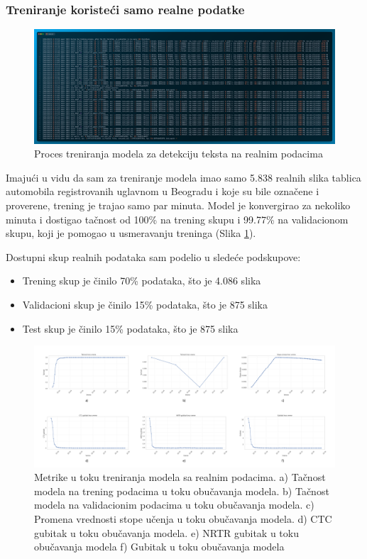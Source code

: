 \documentclass[a4paper,12pt]{article}
\begin{document}
	\subsubsection{Treniranje koristeći samo realne podatke}
	\begin{figure}[H]
		\centering
		\includegraphics[width=\textwidth]{assets/train-code-real-data.png}
		\caption{Proces treniranja modela za detekciju teksta na realnim podacima}
		\label{fig:train-code-real-data}
	\end{figure}
	
	Imajući u vidu da sam za treniranje modela imao samo 5.838 realnih slika tablica automobila registrovanih uglavnom u Beogradu i koje su bile označene i proverene, trening je trajao samo par minuta. Model je konvergirao za nekoliko minuta i dostigao tačnost od 100\% na trening skupu i 99.77\% na validacionom skupu, koji je pomogao u usmeravanju treninga (Slika \ref{fig:train-code-real-data}).\newline
	
	Dostupni skup realnih podataka sam podelio u sledeće podskupove:
	\begin{itemize}
		\item Trening skup je činilo 70\% podataka, što je 4.086 slika
		\item Validacioni skup je činilo 15\% podataka, što je 875 slika
		\item Test skup je činilo 15\% podataka, što je 875 slika
	\end{itemize}

	\begin{figure}[H]
		\centering
		\includegraphics[width=\textwidth]{assets/real-data-metrics.png}
		\caption{Metrike u toku treniranja modela sa realnim podacima. a) Tačnost modela na trening podacima u toku obučavanja modela. b) Tačnost modela na validacionim podacima u toku obučavanja modela. c) Promena vrednosti stope učenja u toku obučavanja modela. d) CTC gubitak u toku obučavanja modela. e) NRTR gubitak u toku obučavanja modela f) Gubitak u toku obučavanja modela}
		\label{fig:real-data-metrics}
	\end{figure}
	
\end{document}
